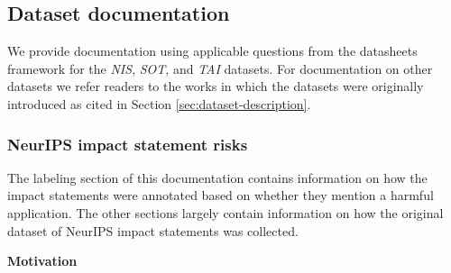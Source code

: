 \documentclass{article}
\begin{document}
\begin{comment}
TweetEval Hate (\textit{TEH}) & Label whether the following tweet contains hate speech against either immigrants or women. \\ \hline

Twitter complaints (\textit{TC}) & A complaint presents a state of affairs which breaches the writer’s favorable expectation. \\ \hline
\end{tabular}
\caption{The full task-specific instructions for each dataset as used in human baseline collection.}
\label{tab:task-instructions}
\end{longtable}

\end{comment}

\subsection{Dataset documentation}

We provide documentation using applicable questions from the datasheets framework \citep{gebru2020datasheets} for the \textit{NIS}, \textit{SOT}, and \textit{TAI} datasets. For documentation on other datasets we refer readers to the works in which the datasets were originally introduced as cited in Section \ref{sec:dataset-description}.

\subsubsection{NeurIPS impact statement risks}

The labeling section of this documentation contains information on how the impact statements were annotated based on whether they mention a harmful application. The other sections largely contain information on how the original dataset of NeurIPS impact statements  \citep{ashurst2021aiethics} was collected.

\textbf{Motivation}
\end{document}
